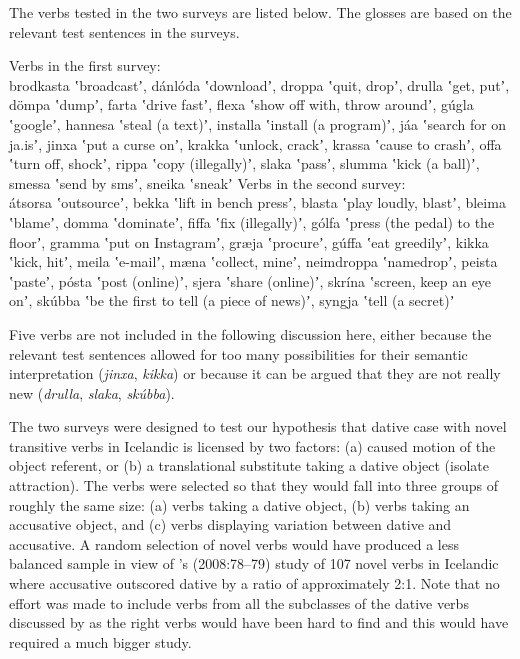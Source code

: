 \documentclass[output=paper,modfonts,nonflat,colorlinks,citecolor=brown]{langsci/langscibook}
\begin{document}
The verbs tested in the two surveys are listed below. The glosses are based on the relevant test sentences in the surveys.


\ea
\ea Verbs in the first survey: \\
brodkasta ʽbroadcastʼ, dánlóda ʽdownloadʼ, droppa ʽquit, dropʼ, drulla ʽget, putʼ, dömpa ʽdumpʼ, farta ʽdrive fastʼ, flexa ʽshow off with, throw aroundʼ, gúgla ʽgoogleʼ, hannesa ʽsteal (a text)ʼ, installa ʽinstall (a program)ʼ, jáa ʽsearch for on ja.isʼ, jinxa ʽput a curse onʼ, krakka ʽunlock, crackʼ, krassa ʽcause to crashʼ, offa ʽturn off, shockʼ, rippa ʽcopy (illegally)ʼ, slaka ʽpassʼ, slumma ʽkick (a ball)ʼ, smessa ʽsend by smsʼ, sneika ʽsneakʼ
\ex Verbs in the second survey: \\
átsorsa ʽoutsourceʼ, bekka ʽlift in bench pressʼ, blasta ʽplay loudly, blastʼ, bleima ʽblameʼ, domma ʽdominateʼ, fiffa ʽfix (illegally)ʼ, gólfa ʽpress (the pedal) to the floorʼ, gramma ʽput on Instagramʼ, græja ʽprocureʼ, gúffa ʽeat greedilyʼ, kikka ʽkick, hitʼ, meila ʽe-mailʼ, mæna ʽcollect, mineʼ, neimdroppa ʽnamedropʼ, peista ʽpasteʼ, pósta ʽpost (online)ʼ, sjera ʽshare (online)ʼ, skrína ʽscreen, keep an eye onʼ, skúbba ʽbe the first to tell (a piece of news)ʼ, syngja ʽtell (a secret)ʼ\\
\z
\z

Five verbs are not included in the following discussion here, either because the relevant test sentences allowed for too many possibilities for their semantic interpretation (\textit{jinxa}, \textit{kikka}) or because it can be argued that they are not really new  (\textit{drulla}, \textit{slaka}, \textit{skúbba}).


The two surveys were designed to test our hypothesis that dative case with novel transitive verbs in Icelandic is licensed by two factors: (a) caused motion of the object referent, or (b) a translational substitute taking a dative object (isolate attraction). The verbs were selected so that they would fall into three groups of roughly the same size: (a) verbs taking a dative object, (b) verbs taking an accusative object, and (c) verbs displaying variation between dative and accusative. A random selection of novel verbs would have produced a less balanced sample in view of \citeauthor{Barðdal2008}’s (2008:78--79) study of 107 novel verbs in Icelandic where accusative outscored dative by a ratio of approximately 2:1. Note that no effort was made to include verbs from all the subclasses of the dative verbs discussed by \citet{Maling2002} as the right verbs would have been hard to find and this would have required a much bigger study.
\end{document}
